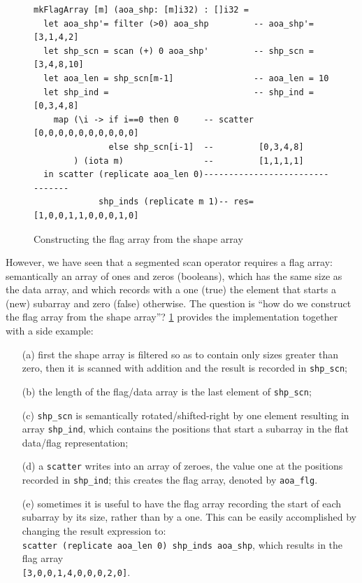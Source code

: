 \documentclass[acmsmall,review]{acmart}\settopmatter{printfolios=true,printccs=false,printacmref=false}
\begin{document}
\begin{figure}
\begin{lstlisting}[mathescape=true]
mkFlagArray [m] (aoa_shp: [m]i32) : []i32 =
  let aoa_shp'= filter (>0) aoa_shp         -- aoa_shp'= [3,1,4,2]
  let shp_scn = scan (+) 0 aoa_shp'         -- shp_scn = [3,4,8,10]
  let aoa_len = shp_scn[m-1]                -- aoa_len = 10
  let shp_ind =                             -- shp_ind = [0,3,4,8]
    map (\i -> if i==0 then 0     -- scatter [0,0,0,0,0,0,0,0,0,0]
               else shp_scn[i-1]  --         [0,3,4,8]
        ) (iota m)                --         [1,1,1,1]
  in scatter (replicate aoa_len 0)--------------------------------
             shp_inds (replicate m 1)-- res= [1,0,0,1,1,0,0,0,1,0] 
\end{lstlisting}\vspace{-4ex}
\caption{Constructing the flag array from the shape array}
\label{fig:make-flag}
\end{figure}

However, we have seen that a segmented scan operator requires
a flag array: semantically an array of ones and zeros (booleans),  
which has the same size as the data array, and which records with
a one (true) the element that starts a (new) subarray and zero (false)
otherwise. The question is ``how do we construct the flag array from
the shape array''?  \cref{fig:make-flag} provides the implementation
together with a side example:
\begin{itemize}
    \item[(a)] first the shape array is filtered so as to contain only
            sizes greater than zero, then it is scanned with addition 
            and the result is recorded in {\tt shp\_scn};
    \item[(b)] the length of the flag/data array is the last element
            of {\tt shp\_scn};
    \item[(c)] {\tt shp\_scn} is semantically rotated/shifted-right
            by one element resulting in array {\tt shp\_ind},
            which contains the positions that start a subarray
            in the flat data/flag representation;
    \item[(d)] a \lstinline{scatter} writes into an array of zeroes,
            the value one at the positions recorded in {\tt shp\_ind};
            this creates the flag array, denoted by {\tt aoa\_flg}.
    \item[(e)] sometimes it is useful to have the flag array
            recording the start of each subarray by its size,
            rather than by a one. This can be easily accomplished
            by changing the result expression to:\\
            \lstinline{scatter (replicate aoa_len 0) shp_inds aoa_shp},
            which results in the flag array\\
            {\tt[3,0,0,1,4,0,0,0,2,0]}.
\end{itemize}
\end{document}
